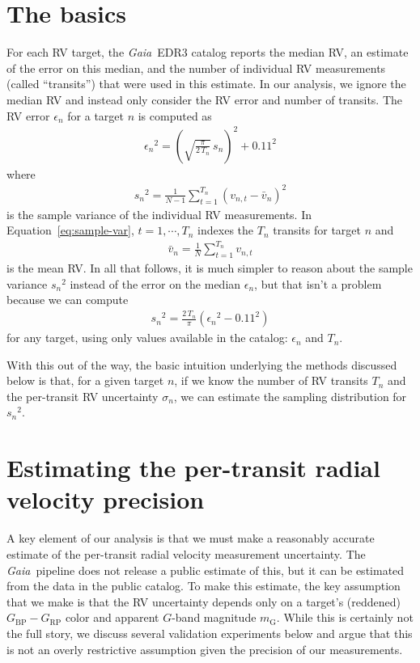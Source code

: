 \documentclass[modern, letterpaper]{aastex63}
\newcommand{\project}[1]{\textsl{#1}}
\newcommand{\Gaia}{\project{Gaia}}
\begin{document}
\section{The basics}

For each RV target, the \Gaia\ EDR3 catalog reports the median RV, an estimate of the error on this median, and the number of individual RV measurements (called ``transits'') that were used in this estimate.
In our analysis, we ignore the median RV and instead only consider the RV error and number of transits.
The RV error $\epsilon_n$ for a target $n$ is computed as \citep{Katz19}
\begin{eqnarray}
  {\epsilon_n}^2 = \left(\sqrt{\frac{\pi}{2\,T_n}}\,s_n\right)^2 + 0.11^2
\end{eqnarray}
where
\begin{eqnarray}
  \label{eq:sample-var}
  {s_n}^2 = \frac{1}{N-1}\sum_{t=1}^{T_n} \left(v_{n,t} - \bar{v}_n\right)^2
\end{eqnarray}
is the sample variance of the individual RV measurements.
In Equation~\ref{eq:sample-var}, $t=1,\cdots,T_n$ indexes the $T_n$ transits for target $n$ and
\begin{eqnarray}
  \bar{v}_n = \frac{1}{N}\sum_{t=1}^{T_n} v_{n,t}
\end{eqnarray}
is the mean RV.
In all that follows, it is much simpler to reason about the sample variance ${s_n}^2$ instead of the error on the median ${\epsilon}_n$, but that isn't a problem because we can compute
\begin{eqnarray}
  {s_n}^2 = \frac{2\,T_n}{\pi}\left({\epsilon_n}^2 - 0.11^2\right)
\end{eqnarray}
for any target, using only values available in the catalog: $\epsilon_n$ and $T_n$.

With this out of the way, the basic intuition underlying the methods discussed below is that, for a given target $n$, if we know the number of RV transits $T_n$ and the per-transit RV uncertainty $\sigma_n$, we can estimate the sampling distribution for ${s_n}^2$.

\section{Estimating the per-transit radial velocity precision}

A key element of our analysis is that we must make a reasonably accurate estimate of the per-transit radial velocity measurement uncertainty.
The \Gaia\ pipeline does not release a public estimate of this, but it can be estimated from the data in the public catalog.
To make this estimate, the key assumption that we make is that the RV uncertainty depends only on a target's (reddened) $G_\mathrm{BP} - G_\mathrm{RP}$ color and apparent $G$-band magnitude $m_\mathrm{G}$.
While this is certainly not the full story, we discuss several validation experiments below and argue that this is not an overly restrictive assumption given the precision of our measurements.
\end{document}

